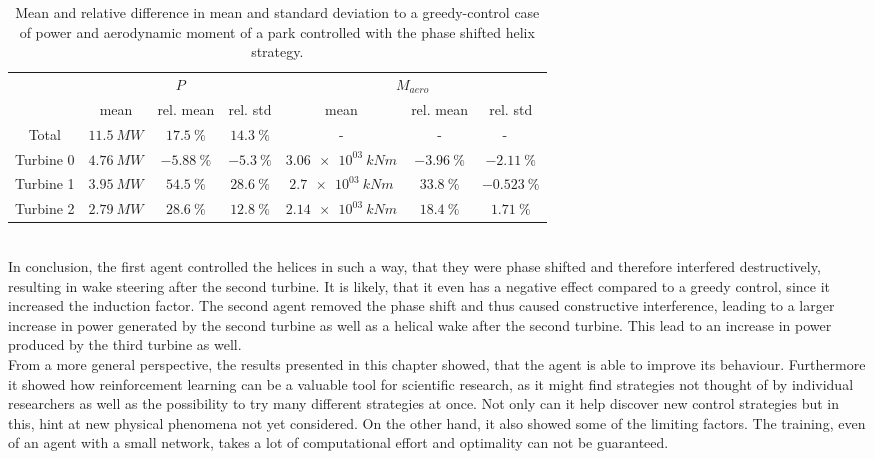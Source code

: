 \begin{table}[h]
	\centering
	\caption{Mean and relative difference in mean and standard deviation to a greedy-control case of power and aerodynamic moment of a park controlled with the phase shifted helix strategy.}
	\begin{tabular}{ccccccc}
		\toprule
		& \multicolumn{3}{c}{$P$}  & \multicolumn{3}{c}{$M_{aero}$ }\\ \cmidrule(rl){2-4} \cmidrule(rl){5-7}
		& mean & rel. mean & rel. std  & mean & rel. mean & rel. std \\ \midrule
		Total & $\SI{  11.5}{MW} $ & $\SI{ +17.5}{\%}$ & $\SI{ +14.3}{\%}$ &-&-&- \
		\\
		Turbine 0  & $\SI{  4.76}{MW} $ & $\SI{ -5.88}{\%}$ & $\SI{  -5.3}{\%}$ & $\SI{3.06e03}{kNm} $ & $\SI{ -3.96}{\%}$ & $\SI{ -2.11}{\%}$ \\
		Turbine 1  & $\SI{  3.95}{MW} $ & $\SI{ +54.5}{\%}$ & $\SI{ +28.6}{\%}$ & $\SI{2.7e03}{kNm} $ & $\SI{ +33.8}{\%}$ & $\SI{-0.523}{\%}$ \\
		Turbine 2  & $\SI{  2.79}{MW} $ & $\SI{ +28.6}{\%}$ & $\SI{ +12.8}{\%}$ & $\SI{2.14e03}{kNm} $ & $\SI{ +18.4}{\%}$ & $\SI{ +1.71}{\%}$ \\
		\bottomrule
	\end{tabular}
	\label{tab:optimal_greedy}
\end{table} \\
In conclusion, the first agent controlled the helices in such a way, that they were phase shifted and therefore interfered destructively, resulting in wake steering after the second turbine. It is likely, that it even has a negative effect compared to a greedy control, since it increased the induction factor. The second agent removed the phase shift and thus caused constructive interference, leading to a larger increase in power generated by the second turbine as well as a helical wake after the second turbine. This lead to an increase in power produced by the third turbine as well.\\
From a more general perspective, the results presented in this chapter showed, that the agent is able to improve its behaviour. Furthermore it showed how reinforcement learning can be a valuable tool for scientific research, as it might find strategies not thought of by individual researchers as well as the possibility to try many different strategies at once. Not only can it help discover new control strategies but in this, hint at new physical phenomena not yet considered. On the other hand, it also showed some of the limiting factors. The training, even of an agent with a small network, takes a lot of computational effort and optimality can not be guaranteed. \\
